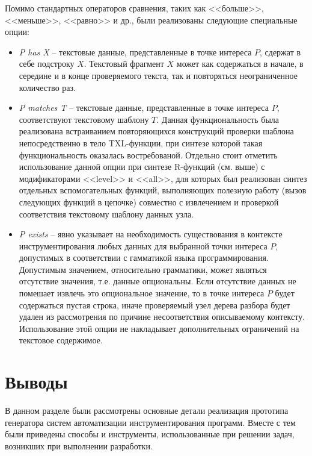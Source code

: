 Помимо стандартных операторов сравнения, таких как <<больше>>, <<меньше>>, <<равно>> и др., были реализованы следующие специальные опции:
\begin{itemize}[noitemsep]
  \item \textit{P has X} --
  текстовые данные, представленные в точке интереса $P$, сдержат в себе подстроку $X$.
  Текстовый фрагмент $X$ может как содержаться в начале, в середине и в конце проверяемого текста, так и повторяться неограниченное количество раз.

  \item \textit{P matches T} --
  текстовые данные, представленные в точке интереса $P$, соответствуют текстовому шаблону $T$.
  Данная функциональность была реализована встраиванием повторяющихся конструкций проверки шаблона непосредственно в тело TXL-функции, при синтезе которой такая функциональность оказалась востребованой.
  Отдельно стоит отметить использование данной опции при синтезе R-функций (см. выше) с модификаторами <<level>> и <<all>>, для которых был реализован синтез отдельных вспомогательных функций, выполняющих полезную работу (вызов следующих функций в цепочке) совместно с извлечением и проверкой соответствия текстовому шаблону данных узла.

  \item \textit{P exists} --
  явно указывает на необходимость существования в контексте инструментирования любых данных для выбранной точки интереса $P$, допустимых в соответствии с гамматикой языка программирования.
  Допустимым значением, относительно грамматики, может являться отсутствие значения, т.е. данные опциональны.
  Если отсутствие данных не помешает извлечь это опциональное значение, то в точке интереса $P$ будет содержаться пустая строка, иначе проверяемый узел дерева разбора будет удален из рассмотрения по причине несоответствия описываемому контексту. 
  Использование этой опции не накладывает дополнительных ограничений на текстовое содержимое.
\end{itemize}

\section{Выводы}

В данном разделе были рассмотрены основные детали реализация прототипа генератора систем автоматизации инструментирования программ.
Вместе с тем были приведены способы и инструменты, использованные при решении задач, возникших при выполнении разработки.
